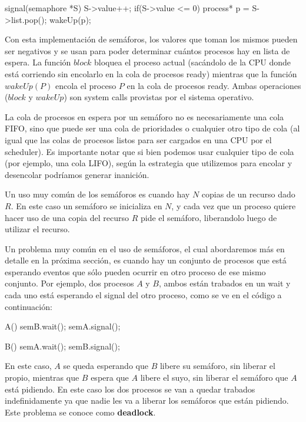 \documentclass{article}
\begin{document}
\begin{code}
signal(semaphore *S)
{
    S->value++;
		if(S->value <= 0)
		{
		    process* p = S->list.pop();
		    wakeUp(p);
		}
}
\end{code}

Con esta implementaci\'on de sem\'aforos, los valores que toman los mismos pueden ser negativos y se usan para poder determinar cu\'antos procesos hay en lista de espera. La funci\'on $block$ bloquea el proceso actual (sac\'andolo de la CPU donde est\'a corriendo sin encolarlo en la cola de procesos ready) mientras que la funci\'on $wakeUp(P)$ encola el proceso $P$ en la cola de procesos ready. Ambas operaciones ($block$ y $wakeUp$) son system calls provistas por el sistema operativo.

La cola de procesos en espera por un sem\'aforo no es necesariamente una cola FIFO, sino que puede ser una cola de prioridades o cualquier otro tipo de cola (al igual que las colas de procesos listos para ser cargados en una CPU por el scheduler). Es importante notar que si bien podemos usar cualquier tipo de cola (por ejemplo, una cola LIFO), seg\'un la estrategia que utilizemos para encolar y desencolar podr\'iamos generar inanici\'on.

Un uso muy com\'un de los sem\'aforos es cuando hay $N$ copias de un recurso dado $R$. En este caso un sem\'aforo se inicializa en $N$, y cada vez que un proceso quiere hacer uso de una copia del recurso $R$ pide el sem\'aforo, liberandolo luego de utilizar el recurso.

Un problema muy com\'un en el uso de sem\'aforos, el cual abordaremos m\'as en detalle en la pr\'oxima secci\'on, es cuando hay un conjunto de procesos que est\'a esperando eventos que s\'olo pueden ocurrir en otro proceso de ese mismo conjunto. Por ejemplo, dos procesos $A$ y $B$, ambos est\'an trabados en un wait y cada uno est\'a esperando el signal del otro proceso, como se ve en el c\'odigo a continuaci\'on:

\begin{code}
A()
{
    semB.wait();
		semA.signal();
}
\end{code}

\begin{code}
B()
{
    semA.wait();
		semB.signal();
}
\end{code}

En este caso, $A$ se queda esperando que $B$ libere su sem\'aforo, sin liberar el propio, mientras que $B$ espera que $A$ libere el suyo, sin liberar el sem\'aforo que $A$ est\'a pidiendo. En este caso los dos procesos se van a quedar trabados indefinidamente ya que nadie les va a liberar los sem\'aforos que est\'an pidiendo. Este problema se conoce como \textbf{deadlock}.
\end{document}
